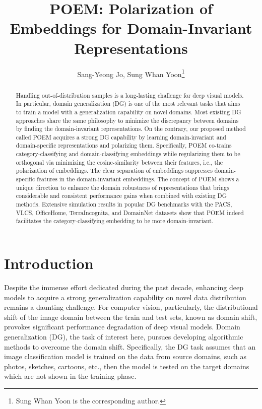 \documentclass[letterpaper]{article} \usepackage{aaai23}  \usepackage{times}  \usepackage{helvet}  \usepackage{courier}  \usepackage[hyphens]{url}  \usepackage{graphicx} \urlstyle{rm} \def\UrlFont{\rm}  \usepackage{natbib}  \usepackage{caption} \frenchspacing  \setlength{\pdfpagewidth}{8.5in}  \setlength{\pdfpageheight}{11in}  \usepackage[labelsep=period]{caption}
\title{POEM: Polarization of Embeddings for Domain-Invariant Representations}
\author {
Sang-Yeong Jo,
	Sung Whan Yoon\thanks{Sung Whan Yoon is the corresponding author.}
}
\begin{document}
\maketitle

\begin{abstract}
	Handling out-of-distribution samples is a long-lasting challenge for deep visual models. In particular, domain generalization (DG) is one of the most relevant tasks that aims to train a model with a generalization capability on novel domains. Most existing DG approaches share the same philosophy to minimize the discrepancy between domains by finding the domain-invariant representations. On the contrary, our proposed method called POEM acquires a strong DG capability by learning domain-invariant and domain-specific representations and polarizing them. Specifically, POEM co-trains category-classifying and domain-classifying embeddings while regularizing them to be orthogonal via minimizing the cosine-similarity between their features, i.e., the polarization of embeddings. The clear separation of embeddings suppresses domain-specific features in the domain-invariant embeddings. The concept of POEM shows a unique direction to enhance the domain robustness of representations that brings considerable and consistent performance gains when combined with existing DG methods. Extensive simulation results in popular DG benchmarks with the PACS, VLCS, OfficeHome, TerraIncognita, and DomainNet datasets show that POEM indeed facilitates the category-classifying embedding to be more domain-invariant.
\end{abstract}

\section{Introduction}


Despite the immense effort dedicated during the past decade, enhancing deep models to acquire a strong generalization capability on novel data distribution remains a daunting challenge.
For computer vision, particularly, the distributional shift of the image domain between the train and test sets, known as domain shift, provokes significant performance degradation of deep visual models. Domain generalization (DG), the task of interest here, pursues developing algorithmic methods to overcome the domain shift. 
Specifically, the DG task assumes that an image classification model is trained on the data from source domains, such as photos, sketches, cartoons, etc., then the model is tested on the target domains which are not shown in the training phase.
\end{document}

